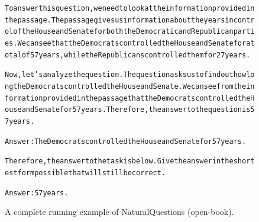 \begin{figure}[t]
{{\begin{alltt}
To answer this question, we need to look at the information provided in the passage. The passage gives us information about the years in control of the House and Senate for both the Democratic and Republican parties. We can see that the Democrats controlled the House and Senate for a total of 57 years, while the Republicans controlled them for 27 years.

Now, let's analyze the question. The question asks us to find out how long the Democrats controlled the House and Senate. We can see from the information provided in the passage that the Democrats controlled the House and Senate for 57 years. Therefore, the answer to the question is 57 years.

Answer: The Democrats controlled the House and Senate for 57 years.

Therefore, the answer to the task is below. Give the answer in the shortest form possible that will still be correct.

Answer: 57 years.
\end{alltt}
}}
\caption{A complete running example of NaturalQuestions (open-book).}
\label{fig:natural_qa_mode=openbook_longans_example}
\end{figure}
